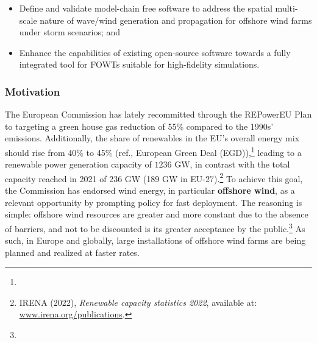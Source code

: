 \begin{itemize}[noitemsep,topsep=0pt]
    \item[\hlblue{RO1}] Define and validate model-chain free software to address the spatial multi-scale nature of wave/wind generation and propagation for offshore wind farms under storm scenarios; and
    \item[\hlblue{RO2}] Enhance the capabilities of existing open-source software towards a fully integrated tool for FOWTs suitable for high-fidelity simulations.\vspace{-2ex}
\end{itemize}



\subsubsection*{Motivation}\vspace{-1ex}
The European Commission has lately recommitted through the REPowerEU Plan to targeting a green house gas reduction of 55\% compared to the 1990s' emissions. Additionally, the share of renewables in the EU’s overall energy mix should rise from 40\% to 45\% (ref., European Green Deal (EGD)),\footnote{} leading to a renewable power generation capacity of $1236$ GW, in contrast with the total capacity reached in 2021 of 236 GW (189 GW in EU-27).\footnote{IRENA (2022), \textit{Renewable capacity statistics 2022}, available at: \url{www.irena.org/publications}.} %
To achieve this goal, the Commission has endorsed wind energy, in particular \textbf{offshore wind}, as a relevant opportunity by prompting policy for fast deployment. The reasoning is simple: offshore wind resources are greater and more constant due to the absence of barriers, and not to be discounted is its greater acceptance by the public.\footnote{} 
As such, in Europe and globally, large installations of offshore wind farms are being planned and realized at faster rates.%

